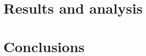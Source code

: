 \documentclass[10pt,a4paper]{article}
\begin{document}

\section{Results and analysis}

\section{Conclusions}




\newpage

\begin{appendices}


\end{appendices}



\end{document}
